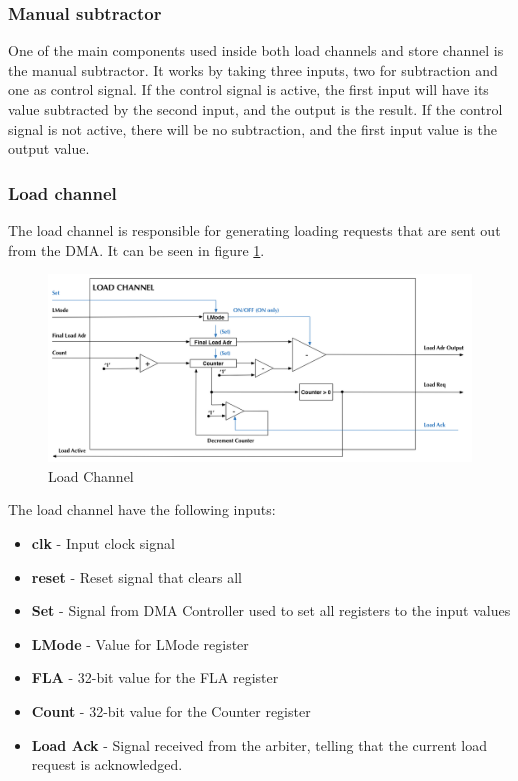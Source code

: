 \begin{appendix}
\subsubsection{Manual subtractor}
One of the main components used inside both load channels and store channel is the manual subtractor.
It works by taking three inputs, two for subtraction and one as control signal.
If the control signal is active, the first input will have its value subtracted by the second input, and the output is the result.
If the control signal is not active, there will be no subtraction, and the first input value is the output value. 

\subsubsection{Load channel}
The load channel is responsible for generating loading requests that are sent out from the DMA.
It can be seen in figure \ref{fig:loadChannel}.

\begin{figure}[h!]
    \centering
    \includegraphics[width=1.0\textwidth]{Figures/DMA/LoadChannel}
    \caption{Load Channel}
    \label{fig:loadChannel}
\end{figure}

The load channel have the following inputs:

\begin{itemize}
    \item \textbf{clk} - Input clock signal
    \item \textbf{reset} - Reset signal that clears all 
    \item \textbf{Set} - Signal from DMA Controller used to set all registers to the input values
    \item \textbf{LMode} - Value for LMode register
    \item \textbf{FLA} - 32-bit value for the FLA register
    \item \textbf{Count} - 32-bit value for the Counter register
    \item \textbf{Load Ack} - Signal received from the arbiter, telling that the current load request is acknowledged.
\end{itemize}


\end{appendix}

